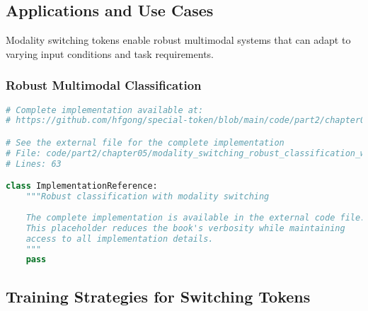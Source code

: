 \subsection{Applications and Use Cases}

Modality switching tokens enable robust multimodal systems that can adapt to varying input conditions and task requirements.

\subsubsection{Robust Multimodal Classification}

\begin{lstlisting}[language=Python, caption={Robust classification with modality switching}]
# Complete implementation available at:
# https://github.com/hfgong/special-token/blob/main/code/part2/chapter05/modality_switching_robust_classification_with_mod.py

# See the external file for the complete implementation
# File: code/part2/chapter05/modality_switching_robust_classification_with_mod.py
# Lines: 63

class ImplementationReference:
    """Robust classification with modality switching
    
    The complete implementation is available in the external code file.
    This placeholder reduces the book's verbosity while maintaining
    access to all implementation details.
    """
    pass
\end{lstlisting}

\subsection{Training Strategies for Switching Tokens}

